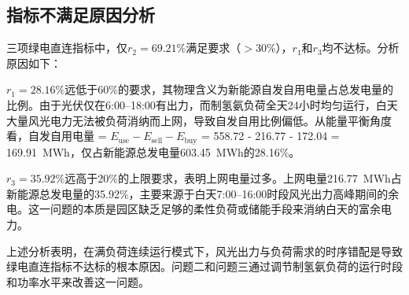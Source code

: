 \subsection{指标不满足原因分析}

三项绿电直连指标中，仅$r_2 = 69.21\%$满足要求（$>30\%$），$r_1$和$r_3$均不达标。分析原因如下：

$r_1 = 28.16\%$远低于60\%的要求，其物理含义为新能源自发自用电量占总发电量的比例。由于光伏仅在6:00--18:00有出力，而制氢氨负荷全天24小时均匀运行，白天大量风光电力无法被负荷消纳而上网，导致自发自用比例偏低。从能量平衡角度看，自发自用电量 = $E_{\text{use}} - E_{\text{sell}} - E_{\text{buy}}$ = 558.72 - 216.77 - 172.04 = 169.91~MWh，仅占新能源总发电量603.45~MWh的28.16\%。

$r_3 = 35.92\%$远高于20\%的上限要求，表明上网电量过多。上网电量216.77~MWh占新能源总发电量的35.92\%，主要来源于白天7:00--16:00时段风光出力高峰期间的余电。这一问题的本质是园区缺乏足够的柔性负荷或储能手段来消纳白天的富余电力。

上述分析表明，在满负荷连续运行模式下，风光出力与负荷需求的时序错配是导致绿电直连指标不达标的根本原因。问题二和问题三通过调节制氢氨负荷的运行时段和功率水平来改善这一问题。
